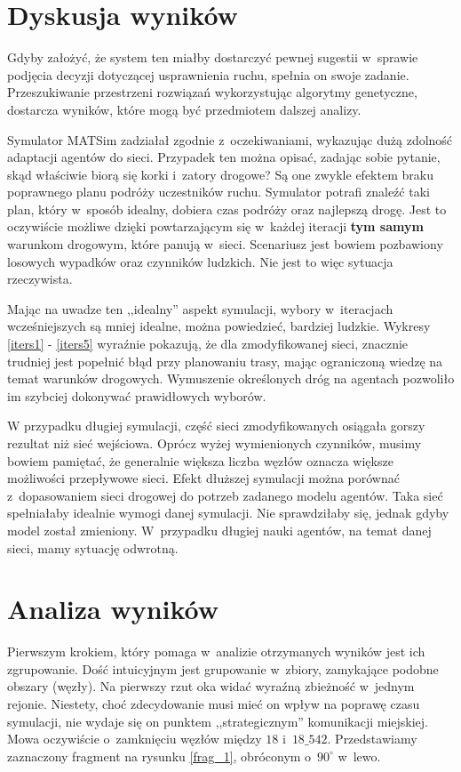 \documentclass[twoside,12pt]{report}
\begin{document}
\section{Dyskusja wyników}
Gdyby założyć, że system ten miałby dostarczyć pewnej sugestii w~sprawie podjęcia decyzji dotyczącej usprawnienia ruchu, spełnia on swoje zadanie. Przeszukiwanie przestrzeni rozwiązań wykorzystując algorytmy genetyczne, dostarcza wyników, które mogą być przedmiotem dalszej analizy.

Symulator MATSim zadziałał zgodnie z~oczekiwaniami, wykazując dużą zdolność adaptacji agentów do sieci. Przypadek ten można opisać, zadając sobie pytanie, skąd właściwie biorą się korki i~zatory drogowe? Są one zwykle efektem braku poprawnego planu podróży uczestników ruchu. Symulator potrafi znaleźć taki plan, który w~sposób idealny, dobiera czas podróży oraz najlepszą drogę. Jest to oczywiście możliwe dzięki powtarzającym się w~każdej iteracji \textbf{tym samym} warunkom drogowym, które panują w~sieci. Scenariusz jest bowiem pozbawiony losowych wypadków oraz czynników ludzkich. Nie jest to więc sytuacja rzeczywista.

Mając na uwadze ten ,,idealny'' aspekt symulacji, wybory w~iteracjach wcześniejszych są mniej idealne, można powiedzieć, bardziej ludzkie. Wykresy \ref{iters1} - \ref{iters5} wyraźnie pokazują, że dla zmodyfikowanej sieci, znacznie trudniej jest popełnić błąd przy planowaniu trasy, mając ograniczoną wiedzę na temat warunków drogowych. Wymuszenie określonych dróg na agentach pozwoliło im szybciej dokonywać prawidłowych wyborów.

W przypadku długiej symulacji, część sieci zmodyfikowanych osiągała gorszy rezultat niż sieć wejściowa. Oprócz wyżej wymienionych czynników, musimy bowiem pamiętać, że generalnie większa liczba węzłów oznacza większe możliwości przepływowe sieci. Efekt dłuższej symulacji można porównać z~dopasowaniem sieci drogowej do potrzeb zadanego modelu agentów. Taka sieć spełniałaby idealnie wymogi danej symulacji. Nie sprawdziłaby się, jednak gdyby model został zmieniony. W~przypadku długiej nauki agentów, na temat danej sieci, mamy sytuację odwrotną.

\section{Analiza wyników}
Pierwszym krokiem, który pomaga w~analizie otrzymanych wyników jest ich zgrupowanie. Dość intuicyjnym jest grupowanie w~zbiory, zamykające podobne obszary (węzły). Na pierwszy rzut oka widać wyraźną zbieżność w~jednym rejonie. Niestety, choć zdecydowanie musi mieć on wpływ na poprawę czasu symulacji, nie wydaje się on punktem ,,strategicznym'' komunikacji miejskiej. Mowa oczywiście o~zamknięciu węzłów między $18$ i~$18\_542$. Przedstawiamy zaznaczony fragment na rysunku \ref{frag_1}, obróconym o~$90^{\circ}$ w~lewo.
\end{document}
